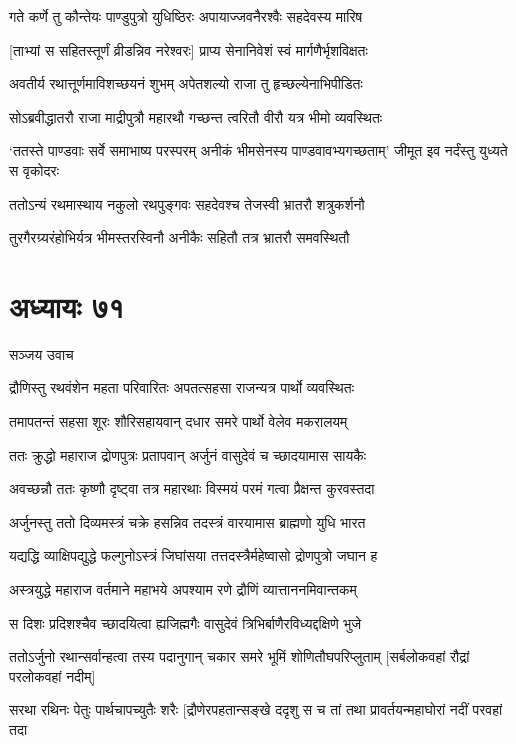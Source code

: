 \twolineshloka
{गते कर्णे तु कौन्तेयः पाण्डुपुत्रो युधिष्ठिरः}
{अपायाज्जवनैरश्वैः सहदेवस्य मारिष}


\twolineshloka
{[ताभ्यां स सहितस्तूर्णं व्रीडन्निव नरेश्वरः]}
{प्राप्य सेनानिवेशं स्वं मार्गणैर्भृशविक्षतः}


\twolineshloka
{अवतीर्य रथात्तूर्णमाविशच्छयनं शुभम्}
{अपेतशल्यो राजा तु हृच्छल्येनाभिपीडितः}


\twolineshloka
{सोऽब्रवीद्धातरौ राजा माद्रीपुत्रौ महारथौ}
{गच्छन्त त्वरितौ वीरौ यत्र भीमो व्यवस्थितः}


\threelineshloka
{`ततस्ते पाण्डवाः सर्वे समाभाष्य परस्परम्}
{अनीकं भीमसेनस्य पाण्डवावभ्यगच्छताम्'}
{जीमूत इव नर्दंस्तु युध्यते स वृकोदरः}


\twolineshloka
{ततोऽन्यं रथमास्थाय नकुलो रथपुङ्गवः}
{सहदेवश्च तेजस्वी भ्रातरौ शत्रुकर्शनौ}


\twolineshloka
{तुरगैरग्र्यरंहोभिर्यत्र भीमस्तरस्विनौ}
{अनीकैः सहितौ तत्र भ्रातरौ समवस्थितौ}


\chapter{अध्यायः ७१}
\twolineshloka
{सञ्जय उवाच}
{}


\twolineshloka
{द्रौणिस्तु रथवंशेन महता परिवारितः}
{अपतत्सहसा राजन्यत्र पार्थो व्यवस्थितः}


\twolineshloka
{तमापतन्तं सहसा शूरः शौरिसहायवान्}
{दधार समरे पार्थो वेलेव मकरालयम्}


\twolineshloka
{ततः क्रुद्धो महाराज द्रोणपुत्रः प्रतापवान्}
{अर्जुनं वासुदेवं च च्छादयामास सायकैः}


\twolineshloka
{अवच्छन्नौ ततः कृष्णौ दृष्ट्वा तत्र महारथाः}
{विस्मयं परमं गत्वा प्रैक्षन्त कुरवस्तदा}


\twolineshloka
{अर्जुनस्तु ततो दिव्यमस्त्रं चक्रे हसन्निव}
{तदस्त्रं वारयामास ब्राह्मणो युधि भारत}


\twolineshloka
{यद्यद्धि व्याक्षिपद्युद्धे फल्गुनोऽस्त्रं जिघांसया}
{तत्तदस्त्रैर्महेष्वासो द्रोणपुत्रो जघान ह}


\twolineshloka
{अस्त्रयुद्धे महाराज वर्तमाने महाभये}
{अपश्याम रणे द्रौणिं व्यात्ताननमिवान्तकम्}


\twolineshloka
{स दिशः प्रदिशश्चैव च्छादयित्वा ह्यजिह्मगैः}
{वासुदेवं त्रिभिर्बाणैरविध्यद्दक्षिणे भुजे}


\threelineshloka
{ततोऽर्जुनो रथान्सर्वान्हत्वा तस्य पदानुगान्}
{चकार समरे भूमिं शोणितौघपरिप्लुताम्}
{[सर्बलोकवहां रौद्रां परलोकवहां नदीम्]}


सरथा रथिनः पेतुः पार्थचापच्युतैः शरैः
\twolineshloka
{[द्रौणेरपहतान्सङ्खे ददृशु स च तां तथा}
{प्रावर्तयन्महाघोरां नदीं परवहां तदा}


